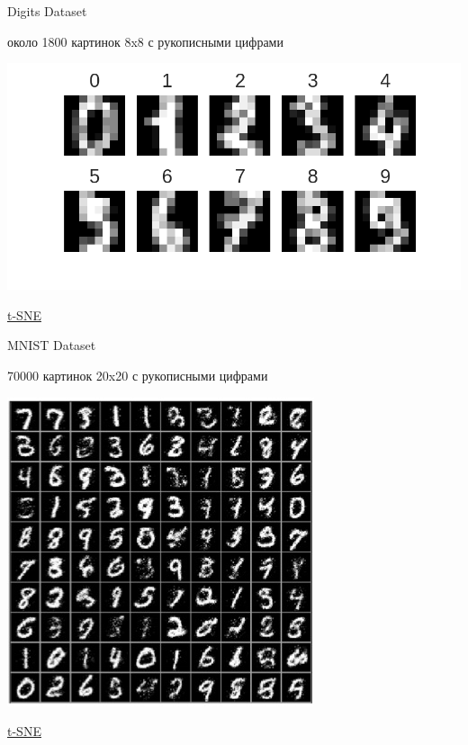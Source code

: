 \documentclass[aspectratio=169]{beamer}
\begin{document}
\begin{frame}{Digits Dataset}

около 1800 картинок 8x8 с рукописными цифрами

\begin{center}
\includegraphics[scale=0.5]{images/digits.png}
\end{center}

\href{https://raw.githubusercontent.com/oreillymedia/t-SNE-tutorial/master/images/animation.gif}{t-SNE}

\end{frame}

\begin{frame}{MNIST Dataset}

70000 картинок 20x20 с рукописными цифрами

\begin{center}
\includegraphics[scale=1.0]{images/mnistdigits.jpg}
\end{center}

\href{http://lvdmaaten.github.io/tsne/examples/mnist_tsne.jpg}{t-SNE}

\end{frame}
\end{document}
